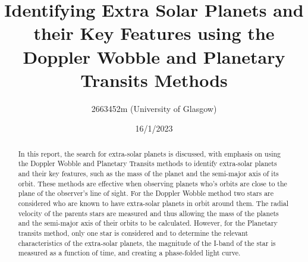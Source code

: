 \documentclass[]{article}
\title{\textbf{Identifying Extra Solar Planets and their Key Features using 
the Doppler Wobble and Planetary Transits Methods}}
\author{2663452m (University of Glasgow)}
\date{16/1/2023}
\begin{document}
\maketitle

\begin{abstract}
In this report, the search for extra-solar planets is discussed,
with emphasis on using the Doppler Wobble and Planetary Transits 
methods to identify extra-solar planets and their key features, 
such as the mass of the planet and the semi-major axis of its orbit.
These methods are effective when observing planets who's orbits 
are close to the plane of the observer's line of sight. For the Doppler 
Wobble method two stars are considered who are known to have
extra-solar planets in orbit around them. The radial velocity of 
the parents stars are measured and thus allowing the mass of the 
planets and the semi-major axis of their orbits to be calculated.
However, for the Planetary transits method, only one star is considered
and to determine the relevant characteristics of the extra-solar planets,
the magnitude of the I-band of the star is measured as a function
of time, and creating a phase-folded light curve.
  



\end{abstract}
\newpage



\twocolumn
\end{document}
